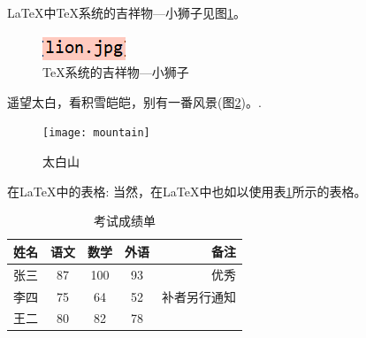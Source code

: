 \documentclass{ctexart}%
\begin{document}
	\LaTeX{}中\TeX 系统的吉祥物---小狮子见图\ref{fig-lion}。
	
	\begin{figure} [htbp]
		\centering
		\includegraphics [scale=0.1]{lion}
		\caption{\TeX 系统的吉祥物---小狮子}\label{fig-lion} 
	\end{figure}
	
	遥望太白，看积雪皑皑，别有一番风景(图\ref{fig-mountain})。.
	\begin{figure}[htbp]%
		\centering
		\texttt{[image: mountain]}
		\caption{太白山}\label{fig-mountain}
	\end{figure}
	
	
	在\LaTeX{}中的表格:
	当然，在\LaTeX{}中也如以使用表\ref {tab-score}所示的表格。%
	\begin{table}[h]
		\centering
		\caption{考试成绩单} \label{tab-score}
		
		\begin{tabular}{|l|c|c|c|r|}
			\hline
			姓名 & 语文 & 数学 & 外语 & 备注 \\
			\hline
			张三 & 87 & 100 & 93 & 优秀 \\
			\hline
			李四 & 75 & 64 & 52 & 补者另行通知 \\
			\hline
			王二 & 80 & 82 & 78 & \\
			\hline
		\end{tabular}
	\end{table}
\end{document}
